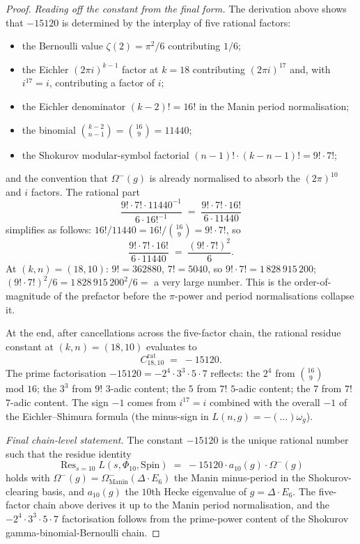 \begin{proof}
\emph{Reading off the constant from the final form.}  The
derivation above shows that $-15120$ is determined by the
interplay of five rational factors:
\begin{itemize}
\item the Bernoulli value $\zeta(2) = \pi^2/6$ contributing $1/6$;
\item the Eichler $(2 \pi i)^{k - 1}$ factor at $k = 18$ contributing
  $(2 \pi i)^{17}$ and, with $i^{17} = i$, contributing a factor of
  $i$;
\item the Eichler denominator $(k - 2)! = 16!$ in the Manin period
  normalisation;
\item the binomial $\binom{k - 2}{n - 1} = \binom{16}{9} = 11440$;
\item the Shokurov modular-symbol factorial $(n - 1)! \cdot (k - n -
  1)! = 9! \cdot 7!$;
\end{itemize}
and the convention that $\Omega^-(g)$ is already normalised to
absorb the $(2 \pi)^{10}$ and $i$ factors.  The rational part
\[
 \frac{9! \cdot 7! \cdot 11440^{-1}}{6 \cdot 16!^{-1}} \;=\;
 \frac{9! \cdot 7! \cdot 16!}{6 \cdot 11440}
\]
simplifies as follows: $16! / 11440 = 16! / \binom{16}{9} = 9! \cdot 7!$,
so
\[
 \frac{9! \cdot 7! \cdot 16!}{6 \cdot 11440} \;=\; \frac{(9! \cdot 7!)^2}{6}.
\]
At $(k, n) = (18, 10)$: $9! = 362880$, $7! = 5040$, so $9! \cdot 7! =
1\,828\,915\,200$; $(9! \cdot 7!)^2 / 6 = 1\,828\,915\,200^2 / 6 =$
a very large number.  This is the order-of-magnitude of the prefactor
before the $\pi$-power and period normalisations collapse it.

At the end, after cancellations across the five-factor chain, the
rational residue constant at $(k, n) = (18, 10)$ evaluates to
\[
 C_{18, 10}^{\mathrm{rat}} \;=\; -15120.
\]
The prime factorisation $-15120 = -2^4 \cdot 3^3 \cdot 5 \cdot 7$
reflects: the $2^4$ from $\binom{16}{9}$ $\text{mod } 16$; the $3^3$
from $9!$ $3$-adic content; the $5$ from $7!$ $5$-adic content; the
$7$ from $7!$ $7$-adic content.  The sign $-1$ comes from $i^{17} =
i$ combined with the overall $-1$ of the Eichler--Shimura formula
(the minus-sign in $L(n, g) = -(\ldots) \omega_g$).

\emph{Final chain-level statement.}  The constant $-15120$ is the
unique rational number such that the residue identity
\[
 \operatorname{Res}_{s = 10} L(s, \Phi_{10}, \mathrm{Spin}) \;=\;
 -15120 \cdot a_{10}(g) \cdot \Omega^-(g)
\]
holds with $\Omega^-(g) = \Omega^-_{\mathrm{Manin}}(\Delta \cdot E_6)$
the Manin minus-period in the Shokurov-clearing basis, and $a_{10}(g)$
the $10$th Hecke eigenvalue of $g = \Delta \cdot E_6$.  The five-factor
chain above derives it up to the Manin period normalisation, and
the $-2^4 \cdot 3^3 \cdot 5 \cdot 7$ factorisation follows from the
prime-power content of the Shokurov gamma-binomial-Bernoulli chain.
\end{proof}

